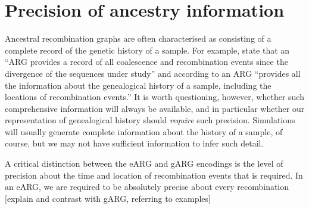 \documentclass{article}
\begin{document}
\section*{Precision of ancestry information}
Ancestral recombination graphs are often characterised
as consisting of a complete record of the genetic history
of a sample. For example,
\cite{rasmussen2014genome} state that an ``ARG provides a record of all
coalescence and recombination events since the divergence of the sequences
under study'' and
according to \cite{deng2021distribution} an ARG
``provides all the information about the genealogical history of a sample,
including the locations of recombination events.'' It is worth
questioning, however, whether such comprehensive information
will always be available, and in particular whether our
representation of genealogical history should \emph{require}
such precision. Simulations will usually generate complete
information about the history of a sample, of course, but
we may not have sufficient information to infer such detail.

A critical distinction between the eARG and gARG encodings
is the level of precision about the time and location of
recombination events that is required. In an eARG, we are
required to be absolutely precise about every recombination
[explain and contrast with gARG, referring to examples]



\end{document}
